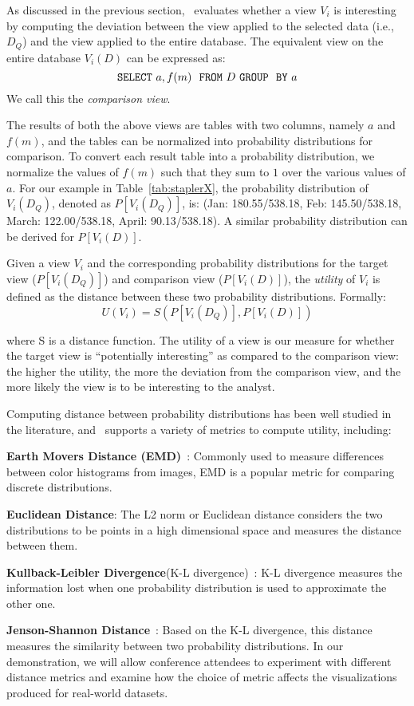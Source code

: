 As discussed in the previous section, \SeeDB\ evaluates
whether a view $V_i$ is interesting
by computing the deviation between the view applied to the selected data (i.e., $D_Q$) 
and the view applied to the entire database.
The equivalent view on the entire database $V_i (D)$ can be expressed as:
$${\tt SELECT \ } a, f(m) \ \ {\tt FROM} \  D\  {\tt GROUP \ \ BY} \ a$$
We call this the {\em comparison view}.

The results of both the above views are tables with two columns, namely $a$ and
$f(m)$, and the tables can be normalized into probability distributions for
comparison. To convert each result table into a probability distribution, we
normalize the values of $f(m)$ such that they sum to $1$ over the various values
of $a$.
For our example in Table~\ref{tab:staplerX}, the probability distribution of
$V_i(D_Q)$, denoted as $P[V_i (D_Q)]$, is: (Jan: 180.55/538.18, Feb:
145.50/538.18, March: 122.00/538.18,  April: 90.13/538.18). A similar
probability distribution can be derived for $P[V_i (D)]$.

Given a view $V_i$ and the corresponding probability distributions for the
target view  ($P[V_i (D_Q)]$) and comparison view ($P[V_i (D)]$), the
{\em utility} of $V_i$ is defined as the distance between these two probability
distributions.
Formally:
$$ U (V_i) = S ( P[V_i (D_Q)], P[V_i (D)] )$$

where S is a distance function. The utility of a view is our measure for whether
the target view is ``potentially interesting'' as compared to the comparison view: 
the higher the utility, the more the deviation
from the comparison view, and the more likely the view is to be interesting to the analyst.

Computing distance between probability distributions has
been well studied in the literature, and \SeeDB\ supports a variety of metrics
to compute utility, including: 
\squishlist
  \item {\bf Earth Movers Distance (EMD)}~\cite{wikipedia-prob-dist}: Commonly used to
  measure differences between color histograms from images, EMD is a popular metric for comparing
  discrete distributions.
  \item {\bf Euclidean Distance}: The L2 norm or
  Euclidean distance considers the two distributions to be points in a high
  dimensional space and measures the distance between them.
  \item {\bf Kullback-Leibler Divergence}(K-L divergence)~\cite{wikipedia-KL}:
  K-L divergence measures the information lost when one probability distribution is used to approximate
  the other one.
  \item {\bf Jenson-Shannon Distance}~\cite{wikipedia-JS,entropy-vis}: Based on
  the K-L divergence, this distance measures the similarity between two probability distributions.
\squishend
In our demonstration, we will allow conference attendees to experiment with
different distance metrics and examine how the choice of metric affects the
visualizations produced for real-world datasets.

